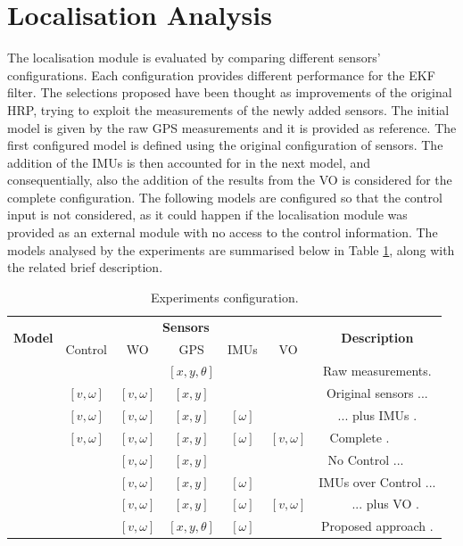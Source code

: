 \section{Localisation Analysis}
\label{sec:locRes}
\noindent
The localisation module is evaluated by comparing different sensors' configurations.
Each configuration provides different performance for the \gls{EKF} filter.
The selections proposed have been thought as improvements of the original \gls{HRP}, trying to exploit the measurements of the newly added sensors.
The initial model is given by the raw \gls{GPS} measurements and it is provided as reference.
The first configured model is defined using the original configuration of sensors.
The addition of the \glspl{IMU} is then accounted for in the next model, and consequentially, also the addition of the results from the \gls{VO} is considered for the complete configuration.
The following models are configured so that the control input is not considered, as it could happen if the localisation module was provided as an external module with no access to the control information.
The models analysed by the experiments are summarised below in Table \ref{tab:eval-models}, along with the related brief description. 
\begin{table}[!ht]
	\small
	\begin{center}
		
		\begin{tabular}{|c||c|c|c|c|c|c|}
			\hline
			\multirow{2}{*}{\textbf{Model}} & \multicolumn{5}{c|}{\textbf{Sensors}} & \multirow{2}{*}{\textbf{Description}}\\
			& \multicolumn{1}{c|}{Control} & \multicolumn{1}{c|}{\gls{WO}} & \multicolumn{1}{c|}{\gls{GPS}} & \multicolumn{1}{c|}{\glspl{IMU}} & \multicolumn{1}{c|}{\gls{VO}} & \\
			\hline
			\hline
			\centering{GPS} &  & & $[x, y, \theta]$ &   &   & Raw measurements. \\
			\hline
			\centering{1} & $[v, \omega]$ & $[v, \omega]$ & $[x, y]$ &   &   & Original sensors ...  \\
			\hline
			\centering{2} & $[v, \omega]$ & $[v, \omega]$ & $[x, y]$ & $[\omega]$ &  & ~~ ... plus IMUs . ~~\\
			\hline
			\centering{3} & $[v, \omega]$ & $[v, \omega]$ & $[x, y]$ & $[\omega]$ & $[v, \omega]$  & Complete . ~~~~~ \\
			\hline
			\centering{4} & & $[v, \omega]$ & $[x, y]$ &  &   & No Control ... ~~~ \\
			\hline
			\centering{5} &  & $[v, \omega]$ & $[x, y]$ & $[\omega]$ &  &  IMUs over Control ... \\
			\hline
			\centering{6} &  & $[v, \omega]$ & $[x, y]$ & $[\omega]$  & $[v, \omega]$  & ~~ ... plus VO . \\
			\hline
			\centering{7} &  & $[v, \omega]$ & $[x, y, \theta]$ & $[\omega]$  &  & Proposed approach . \\
			\hline
			\hline
		\end{tabular}
		\caption{Experiments configuration.\label{tab:eval-models}}
	\end{center}
\end{table}

